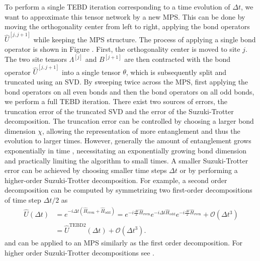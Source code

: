 To perform a single TEBD iteration corresponding to a time evolution of $\Delta t$, we want to approximate this tensor network by a new MPS. This can be done by moving the orthogonality center from left to right, applying the bond operators $\hat{U}^{[j, j+1]}$ while keeping the MPS structure. The process of applying a single bond operator is shown in Figure . First, the orthogonality center is moved to site $j$. The two site tensors $\Lambda^{[j]}$ and $B^{[j+1]}$ are then contracted with the bond operator $\hat{U}^{[j, j+1]}$ into a single tensor $\theta$, which is subsequently split and truncated using an SVD. By sweeping twice across the MPS, first applying the bond operators on all even bonds and then the bond operators on all odd bonds, we perform a full TEBD iteration. There exist two sources of errors, the truncation error of the truncated SVD and the error of the Suzuki-Trotter decomposition. The truncation error can be controlled by choosing a larger bond dimension $\chi$, allowing the representation of more entanglement and thus the evolution to larger times. However, generally the amount of entanglement grows exponentially in time \cite{cite:DMRG_in_the_age_of_MPS}, necessitating an exponentially growing bond dimension and practically limiting the algorithm to small times. A smaller Suzuki-Trotter error can be achieved by choosing smaller time steps $\Delta t$ or by performing a higher-order Suzuki-Trotter decomposition. For example, a second order decomposition can be computed by symmetrizing two first-order decompositions of time step $\Delta t /2$ as
\begin{equation}
	\begin{split}
		\hat{U}(\Delta t) &= e^{-i\Delta t\left(\hat{H}_\text{even} + \hat{H}_\text{odd}\right)} = e^{-i\frac{\Delta t}{2}\hat{H}_\text{even}} e^{-i\Delta t \hat{H}_\text{odd}} e^{-i\frac{\Delta t}{2}\hat{H}_\text{even}} + \mathcal{O}\left(\Delta t^3\right)\\
		&= \hat{U}^\text{TEBD2}(\Delta t) + \mathcal{O}\left(\Delta t^3\right).
	\end{split}
\end{equation}
and can be applied to an MPS similarly as the first order decomposition. For higher order Suzuki-Trotter decompositions see \cite{cite:finding_exponential_product_formulas_of_higher_orders}.
